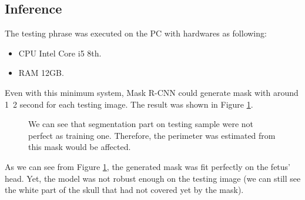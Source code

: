\subsection{Inference}
\label{subsection:mrcnn_inference}
\noindent
	
	The testing phrase was executed on the PC with hardwares as following:
	
	\begin{itemize}
		\item CPU Intel Core i5 8th.
		\item RAM 12GB.
	\end{itemize}
	
	Even with this minimum system, Mask R-CNN could generate mask with around 1~2 second for each testing image. The result was shown in Figure \ref{fig:train_test_result}.
	
	\begin{figure}[H]
		\centering
		\hfill %
		\hfill %
		\caption{We can see that segmentation part on testing sample were not perfect as training one. Therefore, the perimeter was estimated from this mask would be affected.}
		\label{fig:train_test_result}
	\end{figure}
	
	As we can see from Figure \ref{fig:train_test_result}, the generated mask was fit perfectly on the fetus' head. Yet, the model was not robust enough on the testing image (we can still see the white part of the skull that had not covered yet by the mask).
	
